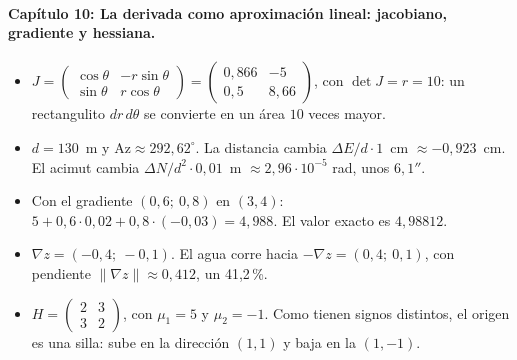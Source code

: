 \paragraph{Capítulo 10: La derivada como aproximación lineal: jacobiano, gradiente y hessiana.}
\begin{itemize}
  \item[\ref{pb:10-1}] \(J=\begin{pmatrix}\cos\theta&-r\sin\theta\\\sin\theta&r\cos\theta\end{pmatrix}=\begin{pmatrix}0{,}866&-5\\0{,}5&8{,}66\end{pmatrix}\), con \(\det J=r=10\): un rectangulito \(dr\,d\theta\) se convierte en un área \(10\) veces mayor.
  \item[\ref{pb:10-2}] \(d=130\)~m y \(\mathrm{Az}\approx292{,}62^\circ\). La distancia cambia \(\Delta E/d\cdot1\)~cm \(\approx-0{,}923\)~cm. El acimut cambia \(\Delta N/d^2\cdot0{,}01\)~m \(\approx2{,}96\cdot10^{-5}\) rad, unos \(6{,}1''\).
  \item[\ref{pb:10-3}] Con el gradiente \((0{,}6;\ 0{,}8)\) en \((3,4)\): \(5+0{,}6\cdot0{,}02+0{,}8\cdot(-0{,}03)=4{,}988\). El valor exacto es \(4{,}98812\).
  \item[\ref{pb:10-4}] \(\nabla z=(-0{,}4;\ -0{,}1)\). El agua corre hacia \(-\nabla z=(0{,}4;\ 0{,}1)\), con pendiente \(\lVert\nabla z\rVert\approx0{,}412\), un 41{,}2\,\%.
  \item[\ref{pb:10-5}] \(H=\begin{pmatrix}2&3\\3&2\end{pmatrix}\), con \(\mu_1=5\) y \(\mu_2=-1\). Como tienen signos distintos, el origen es una silla: sube en la dirección \((1,1)\) y baja en la \((1,-1)\).
\end{itemize}

